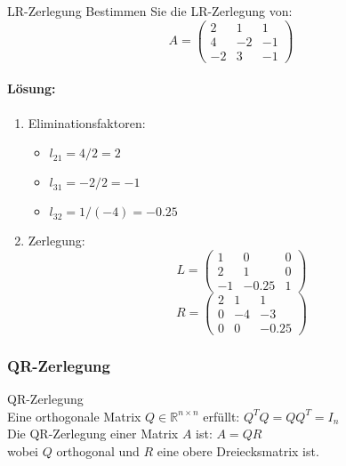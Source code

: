 \begin{example2}{LR-Zerlegung}
Bestimmen Sie die LR-Zerlegung von:
$$A = \begin{pmatrix}
2 & 1 & 1 \\
4 & -2 & -1 \\
-2 & 3 & -1
\end{pmatrix}$$

\paragraph{Lösung:}
\begin{enumerate}
    \item Eliminationsfaktoren:
    \begin{itemize}
        \item $l_{21} = 4/2 = 2$
        \item $l_{31} = -2/2 = -1$
        \item $l_{32} = 1/(-4) = -0.25$
    \end{itemize}
    
    \item Zerlegung:
    $$L = \begin{pmatrix}
    1 & 0 & 0 \\
    2 & 1 & 0 \\
    -1 & -0.25 & 1
    \end{pmatrix}$$
    $$R = \begin{pmatrix}
    2 & 1 & 1 \\
    0 & -4 & -3 \\
    0 & 0 & -0.25
    \end{pmatrix}$$
\end{enumerate}
\end{example2}

\columnbreak

\subsubsection{QR-Zerlegung}

\begin{concept}{QR-Zerlegung}\\
Eine orthogonale Matrix $Q \in \mathbb{R}^{n\times n}$ erfüllt: $Q^T Q = QQ^T = I_n$
\vspace{1mm}\\
Die QR-Zerlegung einer Matrix $A$ ist: $A = QR$
\vspace{1mm}\\
wobei $Q$ orthogonal und $R$ eine obere Dreiecksmatrix ist.
\end{concept}

